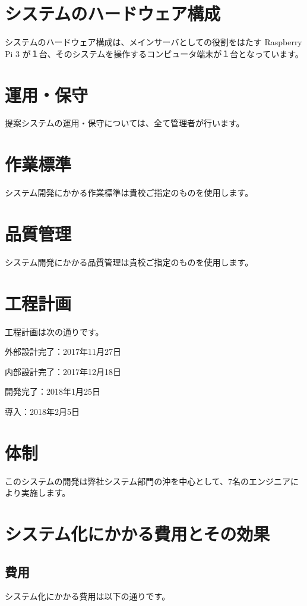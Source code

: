 \documentclass[a4j,titlepage]{ujarticle}
\begin{document}
\section{システムのハードウェア構成}
システムのハードウェア構成は、メインサーバとしての役割をはたす Raspberry Pi 3 が１台、そのシステムを操作するコンピュータ端末が１台となっています。 %

\section{運用・保守}
提案システムの運用・保守については、全て管理者が行います。 %

\section{作業標準}
システム開発にかかる作業標準は貴校ご指定のものを使用します。

\section{品質管理}
システム開発にかかる品質管理は貴校ご指定のものを使用します。

\section{工程計画}
工程計画は次の通りです。

外部設計完了：2017年11月27日

内部設計完了：2017年12月18日

開発完了：2018年1月25日

導入：2018年2月5日

\section{体制}
このシステムの開発は弊社システム部門の沖を中心として、7名のエンジニアにより実施します。

\section{システム化にかかる費用とその効果}
\subsection{費用}
システム化にかかる費用は以下の通りです。
\end{document}
